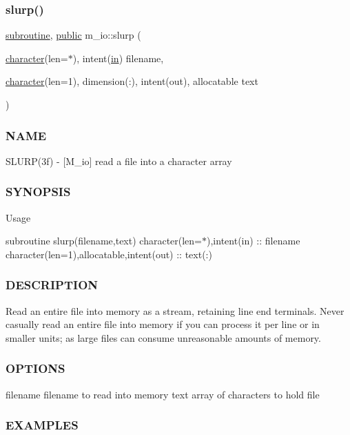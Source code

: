 \subsubsection{\texorpdfstring{slurp()}{slurp()}}
{\footnotesize\ttfamily \hyperlink{M__stopwatch_83_8txt_acfbcff50169d691ff02d4a123ed70482}{subroutine}, \hyperlink{M__stopwatch_83_8txt_a2f74811300c361e53b430611a7d1769f}{public} m\+\_\+io\+::slurp (\begin{DoxyParamCaption}\item[{\hyperlink{option__stopwatch_83_8txt_abd4b21fbbd175834027b5224bfe97e66}{character}(len=$\ast$), intent(\hyperlink{M__journal_83_8txt_afce72651d1eed785a2132bee863b2f38}{in})}]{filename,  }\item[{\hyperlink{option__stopwatch_83_8txt_abd4b21fbbd175834027b5224bfe97e66}{character}(len=1), dimension(\+:), intent(out), allocatable}]{text }\end{DoxyParamCaption})}



\subsubsection*{N\+A\+ME}

S\+L\+U\+R\+P(3f) -\/ \mbox{[}M\+\_\+io\mbox{]} read a file into a character array \subsubsection*{S\+Y\+N\+O\+P\+S\+IS}

Usage

subroutine slurp(filename,text) character(len=$\ast$),intent(in) \+:\+: filename character(len=1),allocatable,intent(out) \+:\+: text(\+:) \subsubsection*{D\+E\+S\+C\+R\+I\+P\+T\+I\+ON}

Read an entire file into memory as a stream, retaining line end terminals. Never casually read an entire file into memory if you can process it per line or in smaller units; as large files can consume unreasonable amounts of memory. \subsubsection*{O\+P\+T\+I\+O\+NS}

filename filename to read into memory text array of characters to hold file \subsubsection*{E\+X\+A\+M\+P\+L\+ES}

